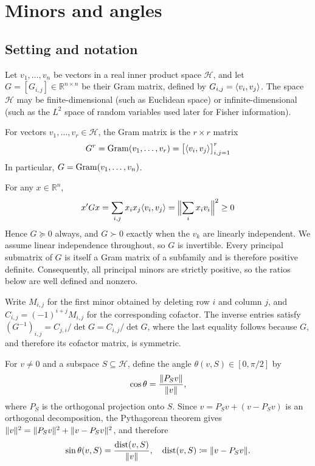 \documentclass{IEEEtran}
\begin{document}
\section{Minors and angles}\label{sec:minor-angle}

\subsection{Setting and notation}

Let $v_{1}, \ldots, v_{n}$ be vectors in a real inner product space $\mathcal{H}$, and let $G = [G_{i,j}] \in \mathbb{R}^{n \times n}$ be their Gram matrix, defined by $G_{i,j} = \inner{v_{i}, v_{j}}$. The space $\mathcal{H}$ may be finite-dimensional (such as Euclidean space) or infinite-dimensional (such as the $L^{2}$ space of random variables used later for Fisher information).

\begin{definition}
  For vectors $v_{1}, \ldots, v_{r} \in \mathcal{H}$, the Gram matrix is the $r \times r$ matrix
  \begin{equation*}
    G^{r} = \gram(v_{1},\ldots,v_{r}) = \bigl[\inner{v_{i}, v_{j}}\bigr]_{i,j=1}^{r}
  \end{equation*}
  In particular, $G = \gram(v_{1},\ldots,v_{n})$.
\end{definition}

For any $x \in \mathbb{R}^{n}$,
\begin{equation*}
  x^{\prime} G x
  = \sum_{i,j} x_{i} x_{j} \inner{v_{i}, v_{j}}
  = \norm[\Big]{\sum_{i} x_{i} v_{i}}^{2}  \ge  0
\end{equation*}
Hence $G \succeq 0$ always, and $G \succ 0$ exactly when the $v_{k}$ are linearly independent. We assume linear independence throughout, so $G$ is invertible. Every principal submatrix of $G$ is itself a Gram matrix of a subfamily and is therefore positive definite. Consequently, all principal minors are strictly positive, so the ratios below are well defined and nonzero.

Write $M_{i,j}$ for the first minor obtained by deleting row $i$ and column $j$, and $C_{i,j} = (-1)^{i+j} M_{i,j}$ for the corresponding cofactor. The inverse entries satisfy $(G^{-1})_{i,j} = C_{j,i}/\det G = C_{i,j}/\det G$, where the last equality follows because $G$, and therefore its cofactor matrix, is symmetric.

For $v \neq 0$ and a subspace $S \subseteq \mathcal{H}$, define the angle $\theta(v, S) \in [0, \pi/2]$ by
\begin{equation*}
  \cos\theta = \frac{\norm{P_{S} v}}{\norm{v}},
\end{equation*}
where $P_{S}$ is the orthogonal projection onto $S$. Since $v = P_{S} v + (v - P_{S} v)$ is an orthogonal decomposition, the Pythagorean theorem gives $\norm{v}^{2} = \norm{P_{S} v}^{2} + \norm{v - P_{S} v}^{2}$, and therefore
\begin{equation}
  \sin\theta(v,S) = \frac{\dist(v, S)}{\norm{v}},
  \quad \dist(v,S) \coloneq \norm{v - P_{S} v} .
  \label{eq:angle-def}
\end{equation}
\end{document}
